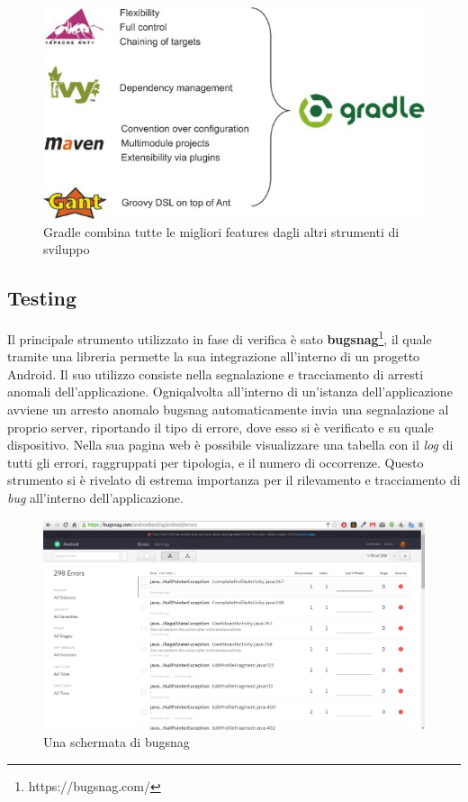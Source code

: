 \begin{figure}[htpd]
\centering
\includegraphics[width=\textwidth/2]{../immagini/gradle}
\caption{Gradle combina tutte le migliori features dagli altri strumenti di sviluppo}  
\end{figure}

\subsection*{Testing}

Il principale strumento utilizzato in fase di verifica è sato \textbf{bugsnag}\footnote{https://bugsnag.com/}, il quale tramite una libreria permette la sua integrazione all'interno di un progetto Android. Il suo utilizzo consiste nella segnalazione e tracciamento di arresti anomali dell'applicazione. Ogniqalvolta all'interno di un'istanza dell'applicazione avviene un arresto anomalo bugsnag automaticamente invia una segnalazione al proprio server, riportando il tipo di errore, dove esso si è verificato e su quale dispositivo. Nella sua pagina web è possibile visualizzare una tabella con il \textit{log} di tutti gli errori, raggruppati per tipologia, e il numero di occorrenze. Questo strumento si è rivelato di estrema importanza per il rilevamento e tracciamento di \textit{bug} all'interno dell'applicazione.

\begin{figure}[htpd]
\centering
\includegraphics[width=\textwidth]{../immagini/bugsnag}
\caption{Una schermata di bugsnag}  
\end{figure}


